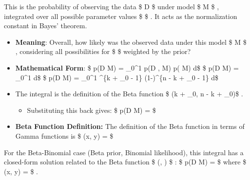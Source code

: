 \documentclass[11pt]{article}
\providecommand{\tightlist}{%
      \setlength{\itemsep}{0pt}\setlength{\parskip}{0pt}}
\begin{document}
This is the probability of observing the data \$ D \$ under model \$ M
\$ , integrated over all possible parameter values \$ \theta \$ . It
acts as the normalization constant in Bayes' theorem.

\begin{itemize}
\tightlist
\item
  \textbf{Meaning}: Overall, how likely was the observed data under this
  model \$ M \$ , considering all possibilities for \$ \theta \$
  weighted by the prior?
\item
  \textbf{Mathematical Form}: \$ p(D \textbar{} M) = \int\_0\^{}1 p(D
  \textbar{} \theta, M) p(\theta \textbar{} M) d\theta \$ \$ p(D
  \textbar{} M) = \int\_0\^{}1
    d\theta \$
  \$ p(D \textbar{} M) =  
  \int\_0\^{}1 \theta\^{}\{k + \alpha\_0 - 1\} (1-\theta)\^{}\{n - k +
  \beta\_0 - 1\} d\theta \$
\item
  The integral is the definition of the Beta function \$ \beta(k +
  \alpha\_0, n - k + \beta\_0)\$ .

  \begin{itemize}
  \tightlist
  \item
    Substituting this back gives: \$ p(D \textbar{} M) = 
    \$
  \end{itemize}
\item
  \textbf{Beta Function Definition:} The definition of the Beta function
  in terms of Gamma functions is \$ \beta(x, y) =
   \$
\end{itemize}

For the Beta-Binomial case (Beta prior, Binomial likelihood), this
integral has a closed-form solution related to the Beta function \$
\beta(\cdot, \cdot) \$ : \$ p(D \textbar{} M) = 
 \$
where \$ \beta(x, y) =  \$ .
\end{document}
